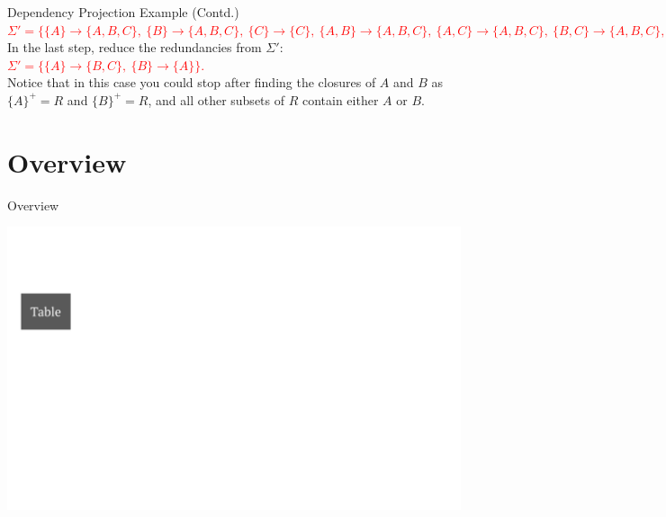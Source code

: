 \documentclass[UTF8]{beamer}
\begin{document}
\begin{frame}{Dependency Projection Example (Contd.)}
\textcolor{red}{$\displaystyle
      \Sigma'=\big\{
        \{A\}\!\to\!\{A,B,C\},\
        \{B\}\!\to\!\{A,B,C\},\
        \{C\}\!\to\!\{C\},\
        \{A,B\}\!\to\!\{A,B,C\},\
        \{A,C\}\!\to\!\{A,B,C\},\
        \{B,C\}\!\to\!\{A,B,C\},\
        \{A,B,C\}\!\to\!\{A,B,C\}
      \big\}.
    $}\\
    In the last step, reduce the redundancies from $\Sigma'$:\\
    \textcolor{red}{$\displaystyle
      \Sigma'=\big\{
        \{A\}\!\to\!\{B,C\},\
        \{B\}\!\to\!\{A\}
      \big\}.
    $}\\
    Notice that in this case you could stop after finding the closures of $A$ and $B$ as $\{A\}^+ = R$ and $\{B\}^+ = R$, and all other subsets of $R$ contain either $A$ or $B$.
\end{frame}

\section{Overview}
\begin{frame}{Overview}
\begin{center}
    \includegraphics[width = 1\linewidth]{fd_norm_images/01.png}
\end{center}
\end{frame}
\end{document}
